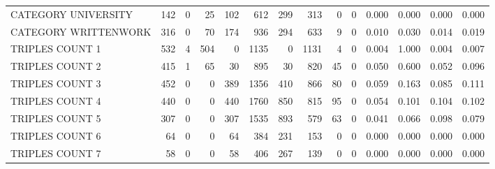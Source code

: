 \begin{tabular}{lrrrrrrrrrllll}
 CATEGORY UNIVERSITY      &             142 &             0 &              25 &             102 &             612 &  299 &  313 &    0 &    0 & 0.000 & 0.000 & 0.000 & 0.000 \\
 CATEGORY WRITTENWORK     &             316 &             0 &              70 &             174 &             936 &  294 &  633 &    9 &    0 & 0.010 & 0.030 & 0.014 & 0.019 \\
 TRIPLES COUNT 1          &             532 &             4 &             504 &               0 &            1135 &    0 & 1131 &    4 &    0 & 0.004 & 1.000 & 0.004 & 0.007 \\
 TRIPLES COUNT 2          &             415 &             1 &              65 &              30 &             895 &   30 &  820 &   45 &    0 & 0.050 & 0.600 & 0.052 & 0.096 \\
 TRIPLES COUNT 3          &             452 &             0 &               0 &             389 &            1356 &  410 &  866 &   80 &    0 & 0.059 & 0.163 & 0.085 & 0.111 \\
 TRIPLES COUNT 4          &             440 &             0 &               0 &             440 &            1760 &  850 &  815 &   95 &    0 & 0.054 & 0.101 & 0.104 & 0.102 \\
 TRIPLES COUNT 5          &             307 &             0 &               0 &             307 &            1535 &  893 &  579 &   63 &    0 & 0.041 & 0.066 & 0.098 & 0.079 \\
 TRIPLES COUNT 6          &              64 &             0 &               0 &              64 &             384 &  231 &  153 &    0 &    0 & 0.000 & 0.000 & 0.000 & 0.000 \\
 TRIPLES COUNT 7          &              58 &             0 &               0 &              58 &             406 &  267 &  139 &    0 &    0 & 0.000 & 0.000 & 0.000 & 0.000 \\
\hline
\end{tabular}